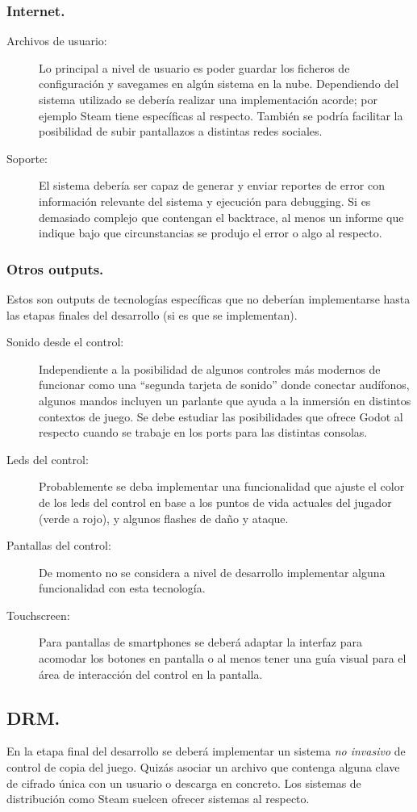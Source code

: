 \subsubsection{Internet.}
\begin{description}
\item[Archivos de usuario:] Lo principal a nivel de usuario es poder guardar los ficheros de configuración y savegames en algún sistema en la nube. Dependiendo del sistema utilizado se debería realizar una implementación acorde; por ejemplo Steam tiene  específicas al respecto. También se podría facilitar la posibilidad de subir pantallazos a distintas redes sociales.

\item[Soporte:] El sistema debería ser capaz de generar y enviar reportes de error con información relevante del sistema y ejecución para debugging. Si es demasiado complejo que contengan el backtrace, al menos un informe que indique bajo que circunstancias se produjo el error o algo al respecto.
\end{description}

\subsubsection{Otros outputs.}
Estos son outputs de tecnologías específicas que no deberían implementarse hasta las etapas finales del desarrollo (si es que se implementan).

\begin{description}
\item[Sonido desde el control:] Independiente a la posibilidad de algunos controles más modernos de funcionar como una “segunda tarjeta de sonido” donde conectar audífonos, algunos mandos incluyen un parlante que ayuda a la inmersión en distintos contextos de juego. Se debe estudiar las posibilidades que ofrece Godot al respecto cuando se trabaje en los ports para las distintas consolas.

\item[Leds del control:] Probablemente se deba implementar una funcionalidad que ajuste el color de los leds del control en base a los puntos de vida actuales del jugador (verde a rojo), y algunos flashes de daño y ataque.

\item[Pantallas del control:] De momento no se considera a nivel de desarrollo implementar alguna funcionalidad con esta tecnología.

\item[Touchscreen:] Para pantallas de smartphones se deberá adaptar la interfaz para acomodar los botones en pantalla o al menos tener una guía visual para el área de interacción del control en la pantalla.
\end{description}

\subsection{DRM.}
En la etapa final del desarrollo se deberá implementar un sistema \emph{no invasivo} de control de copia del juego. Quizás asociar un archivo que contenga alguna clave de cifrado única con un usuario o descarga en concreto. Los sistemas de distribución como Steam suelcen ofrecer sistemas al respecto.